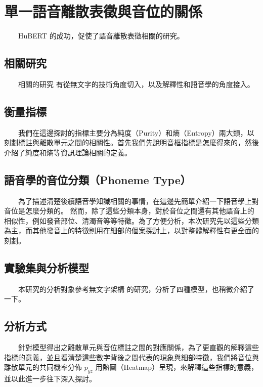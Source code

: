 \chapter{單一語音離散表徵與音位的關係}

　　HuBERT 的成功，促使了語音離散表徵相關的研究。

\section{相關研究}

　　相關的研究 \cite{10097097} 有從無文字的技術角度切入，以及解釋性和語音學的角度接入。

\section{衡量指標}

　　我們在這邊探討的指標主要分為純度（Purity）和熵（Entropy）兩大類，以刻劃標註與離散單元之間的相關性。首先我們先說明音框指標是怎麼得來的，然後介紹了純度和熵等資訊理論相關的定義。

\section{語音學的音位分類（Phoneme Type）}

　　為了描述清楚後續語音學知識相關的事情，在這邊先簡單介紹一下語音學上對音位是怎麼分類的。
        然而，除了這些分類本身，對於音位之間還有其他語音上的相似性，例如發音部位、清濁音等等特徵。為了方便分析，本次研究先以這些分類為主，而其他發音上的特徵則用在細部的個案探討上，以對整體解釋性有更全面的刻劃。

\section{實驗集與分析模型}

　　本研究的分析對象參考無文字架構 \cite{noauthor_textless_2021, lakhotia_generative_2021, lakhotia_generative_2021-1} 的研究，分析了四種模型，也稍微介紹了一下。

\section{分析方式}

　　針對模型得出之離散單元與音位標註之間的對應關係，為了更直觀的解釋這些指標的意義，並且看清楚這些數字背後之間代表的現象與細部特徵，我們將音位與離散單元的共同機率分佈 \(p_{yz}\) 用熱圖（Heatmap）呈現，來解釋這些指標的意義，並以此進一步往下深入探討。

